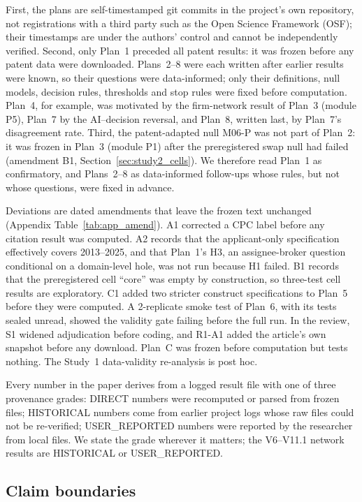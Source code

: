 First, the plans are self-timestamped git commits in the project's own repository, not registrations with a third party such as the Open Science Framework (OSF); their timestamps are under the authors' control and cannot be independently verified. Second, only Plan~1 preceded all patent results: it was frozen before any patent data were downloaded. Plans~2--8 were each written after earlier results were known, so their questions were data-informed; only their definitions, null models, decision rules, thresholds and stop rules were fixed before computation. Plan~4, for example, was motivated by the firm-network result of Plan~3 (module P5), Plan~7 by the AI--decision reversal, and Plan~8, written last, by Plan~7's disagreement rate. Third, the patent-adapted null M06-P was not part of Plan~2: it was frozen in Plan~3 (module P1) after the preregistered swap null had failed (amendment B1, Section~\ref{sec:study2_cells}). We therefore read Plan~1 as confirmatory, and Plans~2--8 as data-informed follow-ups whose rules, but not whose questions, were fixed in advance.

Deviations are dated amendments that leave the frozen text unchanged (Appendix Table~\ref{tab:app_amend}). A1 corrected a CPC label before any citation result was computed. A2 records that the applicant-only specification effectively covers 2013--2025, and that Plan~1's H3, an assignee-broker question conditional on a domain-level hole, was not run because H1 failed. B1 records that the preregistered cell ``core'' was empty by construction, so three-test cell results are exploratory. C1 added two stricter construct specifications to Plan~5 before they were computed. A 2-replicate smoke test of Plan~6, with its tests sealed unread, showed the validity gate failing before the full run. In the review, S1 widened adjudication before coding, and R1-A1 added the article's own snapshot before any download. Plan~C was frozen before computation but tests nothing. The Study~1 data-validity re-analysis is post hoc.

Every number in the paper derives from a logged result file with one of three provenance grades: DIRECT numbers were recomputed or parsed from frozen files; HISTORICAL numbers come from earlier project logs whose raw files could not be re-verified; USER\_REPORTED numbers were reported by the researcher from local files. We state the grade wherever it matters; the V6--V11.1 network results are HISTORICAL or USER\_REPORTED.

\subsection{Claim boundaries}
\label{sec:design_boundaries}

